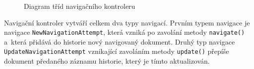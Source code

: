 \begin{figure}[H]
  \begin{center}
    \caption{Diagram tříd navigačního kontroleru}
    \label{Figure.NavigationController}
  \end{center}
\end{figure}

\vspace{-1em}

Navigační kontroler vytváří celkem dva typy navigací. Prvním typem navigace je navigace \texttt{NewNavigationAttempt}, která vzniká po zavolání metody \texttt{navigate()} a~která přidává do historie nový navigovaný dokument. Druhý typ navigace \texttt{UpdateNavigationAttempt} vznikající zavoláním metody \texttt{update()} přepíše dokument předaného záznamu historie, který je tímto aktualizován.

